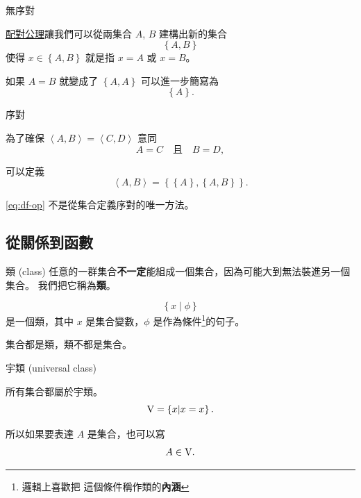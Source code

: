 \documentclass{Slideshow}
\newcommand{\mmhref}[2]{\href{http://us.metamath.org/mpeuni/#1.html}{#2}}
\begin{document}
\begin{frame}{無序對}
    \begin{definition}
        \newcommand{\thepair}{\left\{ A, B \right\}}
        \mmhref{ax-pr}{配對公理}讓我們可以從兩集合 $A$, $B$ 建構出新的集合
        \[ \thepair \]
        使得 $x \in \thepair$ 就是指 $x = A$ 或 $x = B$。
    \end{definition}

    如果 $A = B$ 就變成了 $\left\{ A, A \right\}$ 可以進一步簡寫為
    \[ \left\{ A \right\}.\]
\end{frame}

\begin{frame}{序對}
    \begin{definition}
        為了確保 $\left\langle A, B \right\rangle = \left\langle C, D \right\rangle$ 意同
        \[ A = C \quad \mbox{且} \quad B = D,\]

        可以定義
        \begin{equation}
            \left\langle A, B \right\rangle =
            \left\{ \left\{ A \right\}, \left\{ A, B \right\} \right\}.
            \label{eq:df-op}
        \end{equation}
    \end{definition}

    \eqref{eq:df-op} 不是從集合定義序對的唯一方法。
\end{frame}

\subsection{從關係到函數}
\newcommand{\V}{\textup V}
\newcommand{\conv}{^\smallsmile\!}

\begin{frame}{類 (class)}
    任意的一群集合\textbf{不一定}能組成一個集合，因為可能大到無法裝進另一個集合。
    我們把它稱為\textbf{類}。

    \begin{definition}
        \[ \left\{ x \middle| \phi \right\} \]
        是一個類，其中 $x$ 是集合變數，$\phi$ 是作為條件\footnote{邏輯上喜歡把
        這個條件稱作類的\textbf{內涵}}的句子。
    \end{definition}

    集合都是類，類不都是集合。
\end{frame}

\begin{frame}{宇類 (universal class)}
    \begin{definition}
        所有集合都屬於宇類。
        \[ \V = \left\{ x \middle| x = x \right\}.\]
    \end{definition}

    所以如果要表達 $A$ 是集合，也可以寫
    \[ A \in \textup V.\]
\end{frame}
\end{document}
